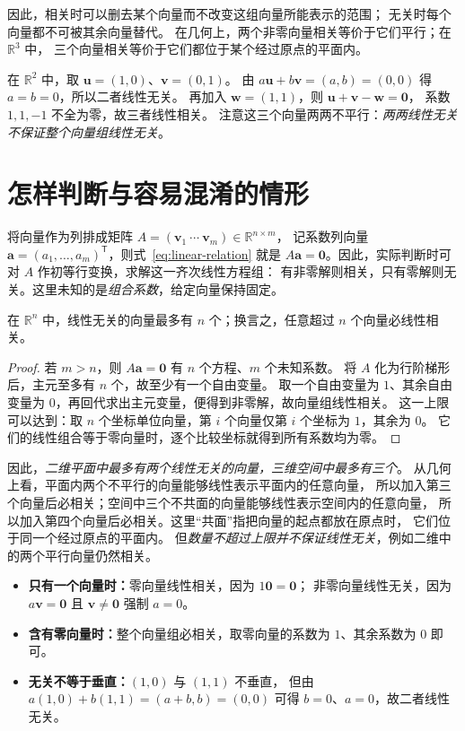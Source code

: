 \documentclass[UTF8,12pt,a4paper,fontset=fandol]{ctexart}
\begin{document}
因此，相关时可以删去某个向量而不改变这组向量所能表示的范围；
无关时每个向量都不可被其余向量替代。
在几何上，两个非零向量相关等价于它们平行；在 $\mathbb R^3$ 中，
三个向量相关等价于它们都位于某个经过原点的平面内。

\begin{example}[无关的一组与相关的一组]
在 $\mathbb R^2$ 中，取 $\boldsymbol{u}=(1,0)$、$\boldsymbol{v}=(0,1)$。
由 $a\boldsymbol{u}+b\boldsymbol{v}=(a,b)=(0,0)$ 得 $a=b=0$，所以二者线性无关。
再加入 $\boldsymbol{w}=(1,1)$，则
$\boldsymbol{u}+\boldsymbol{v}-\boldsymbol{w}=\boldsymbol{0}$，
系数 $1,1,-1$ 不全为零，故三者线性相关。
注意这三个向量两两不平行：\emph{两两线性无关不保证整个向量组线性无关}。
\end{example}

\section{怎样判断与容易混淆的情形}

将向量作为列排成矩阵 $A=(\boldsymbol{v}_1\ \cdots\ \boldsymbol{v}_m)\in\mathbb R^{n\times m}$，
记系数列向量 $\boldsymbol{a}=(a_1,\ldots,a_m)^{\mathsf T}$，则式~\eqref{eq:linear-relation} 就是
$A\boldsymbol{a}=\boldsymbol{0}$。因此，实际判断时可对 $A$ 作初等行变换，求解这一齐次线性方程组：
有非零解则相关，只有零解则无关。这里未知的是\emph{组合系数}，给定向量保持固定。

\begin{proposition}[线性无关向量的数量上限]
在 $\mathbb R^n$ 中，线性无关的向量最多有 $n$ 个；换言之，任意超过 $n$ 个向量必线性相关。
\end{proposition}

\begin{proof}
若 $m>n$，则 $A\boldsymbol{a}=\boldsymbol{0}$ 有 $n$ 个方程、$m$ 个未知系数。
将 $A$ 化为行阶梯形后，主元至多有 $n$ 个，故至少有一个自由变量。
取一个自由变量为 $1$、其余自由变量为 $0$，再回代求出主元变量，便得到非零解，故向量组线性相关。
这一上限可以达到：取 $n$ 个坐标单位向量，第 $i$ 个向量仅第 $i$ 个坐标为 $1$，其余为 $0$。
它们的线性组合等于零向量时，逐个比较坐标就得到所有系数均为零。
\end{proof}

因此，\emph{二维平面中最多有两个线性无关的向量，三维空间中最多有三个}。
从几何上看，平面内两个不平行的向量能够线性表示平面内的任意向量，
所以加入第三个向量后必相关；空间中三个不共面的向量能够线性表示空间内的任意向量，
所以加入第四个向量后必相关。这里“共面”指把向量的起点都放在原点时，
它们位于同一个经过原点的平面内。
但\emph{数量不超过上限并不保证线性无关}，例如二维中的两个平行向量仍然相关。

\begin{itemize}
  \item \textbf{只有一个向量时：}零向量线性相关，因为 $1\boldsymbol{0}=\boldsymbol{0}$；
  非零向量线性无关，因为 $a\boldsymbol{v}=\boldsymbol{0}$ 且 $\boldsymbol{v}\neq\boldsymbol{0}$ 强制 $a=0$。
  \item \textbf{含有零向量时：}整个向量组必相关，取零向量的系数为 $1$、其余系数为 $0$ 即可。
  \item \textbf{无关不等于垂直：}$(1,0)$ 与 $(1,1)$ 不垂直，
  但由 $a(1,0)+b(1,1)=(a+b,b)=(0,0)$ 可得 $b=0$、$a=0$，故二者线性无关。
\end{itemize}
\end{document}
